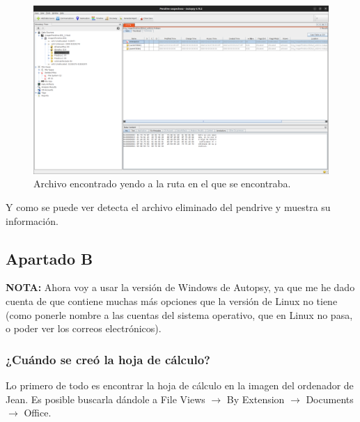 \documentclass{article}
\begin{document}
\begin{figure}[H]
    \centering
    \includegraphics[width=\textwidth]{imagenes/Captura desde 2022-12-03 21-53-51.png}
    \caption{Archivo encontrado yendo a la ruta en el que se encontraba.}
\end{figure}

Y como se puede ver detecta el archivo eliminado del pendrive y muestra su información.


\subsection*{Apartado B}

\textbf{NOTA: }Ahora voy a usar la versión de Windows de Autopsy, ya que me he dado cuenta de que contiene muchas más opciones que la versión de Linux no tiene (como ponerle nombre a las cuentas del sistema operativo, que en Linux no pasa, o poder ver los correos electrónicos).

\subsubsection*{¿Cuándo se creó la hoja de cálculo?}

Lo primero de todo es encontrar la hoja de cálculo en la imagen del ordenador de Jean. Es posible buscarla dándole a File Views $\rightarrow$ By Extension $\rightarrow$ Documents $\rightarrow$ Office.
\end{document}
